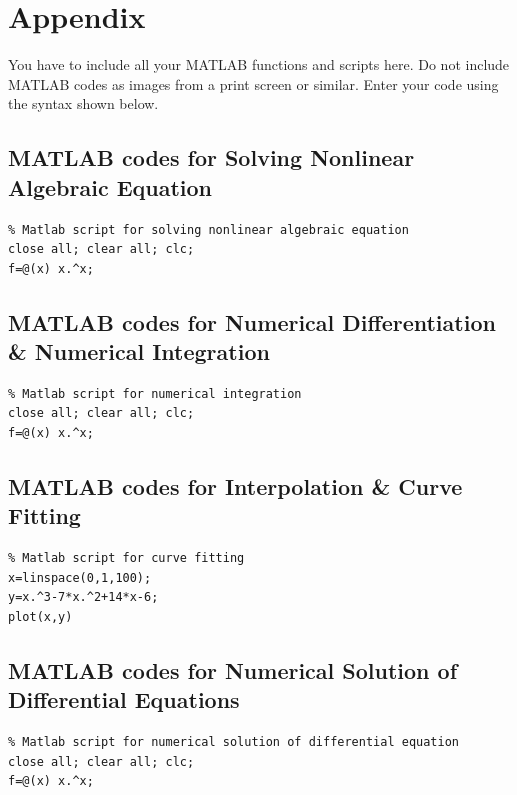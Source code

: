 \documentclass{article}
\begin{document}
\newpage

\section*{Appendix} 

You have to include all your MATLAB functions and scripts here. 
Do not include MATLAB codes as images from a print screen or similar.  Enter your code using the syntax shown below. 

\subsection*{MATLAB codes for Solving Nonlinear Algebraic Equation}

\begin{lstlisting}
% Matlab script for solving nonlinear algebraic equation
close all; clear all; clc;
f=@(x) x.^x;
\end{lstlisting}

\bigskip 

\subsection*{MATLAB codes for Numerical Differentiation \& Numerical Integration}

\begin{lstlisting}
% Matlab script for numerical integration
close all; clear all; clc;
f=@(x) x.^x;
\end{lstlisting}

\bigskip 

\subsection*{MATLAB codes for Interpolation \& Curve Fitting}

\begin{lstlisting}
% Matlab script for curve fitting
x=linspace(0,1,100);
y=x.^3-7*x.^2+14*x-6;
plot(x,y)
\end{lstlisting}

\bigskip

\subsection*{MATLAB codes for Numerical Solution of Differential Equations}

\begin{lstlisting}
% Matlab script for numerical solution of differential equation
close all; clear all; clc;
f=@(x) x.^x;
\end{lstlisting}
\end{document}
